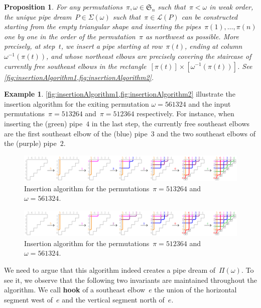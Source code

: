 \documentclass[reqno]{amsart}
\newtheorem{proposition}[theorem]{Proposition}
\theoremstyle{definition}
\newtheorem{example}[theorem]{Example}
\newcommand{\defn}[1]{\textbf{\textsf{\color{PineGreen} #1}}} %
\newcommand{\fS}{\mathfrak{S}} %
\newcommand{\pipeDreams}{\Pi} %
\newcommand{\acyclicPipeDreams}{\Sigma} %
\newcommand{\linearExtensions}{\mathcal{L}} %
\begin{document}
\begin{proposition}
\label{prop:insertionAlgorithm}
For any permutations~$\pi,\omega \in \fS_n$ such that~$\pi < \omega$ in weak order, the unique pipe dream~$P \in \acyclicPipeDreams(\omega)$ such that~$\pi \in \linearExtensions(P)$ can be constructed starting from the empty triangular shape and inserting the pipes~$\pi(1), \dots, \pi(n)$ one by one in the order of the permutation~$\pi$ as northwest as possible.
More precisely, at step~$t$, we insert a pipe starting at row~$\pi(t)$, ending at column~$\omega^{-1}(\pi(t))$, and whose northeast elbows are precisely covering the staircase of currently free southeast elbows in the rectangle~$[\pi(t)] \times [\omega^{-1}(\pi(t))]$.
See \cref{fig:insertionAlgorithm1,fig:insertionAlgorithm2}.
\end{proposition}

\begin{example}
\label{exm:insertionAlgorithm}
\cref{fig:insertionAlgorithm1,fig:insertionAlgorithm2} illustrate the insertion algorithm for the exiting permutation ${\omega = 561324}$ and the input permutations~${\pi = 513264}$ and~${\pi = 512364}$ respectively.
For instance, when inserting the (green) pipe~$4$ in the last step, the currently free southeast elbows are the first southeast elbow of the (blue) pipe~$3$ and the two southeast elbows of the (purple) pipe~$2$.
%
\begin{figure}[t]
	\centerline{\includegraphics[scale=.9]{insertion1}}
	\caption{Insertion algorithm for the permutations~$\pi = 513264$ and~$\omega = 561324$.}
	\label{fig:insertionAlgorithm1}
\end{figure}
%
\begin{figure}[t]
	\centerline{\includegraphics[scale=.9]{insertion2}}
	\caption{Insertion algorithm for the permutations~$\pi = 512364$ and~$\omega = 561324$.}
	\label{fig:insertionAlgorithm2}
\end{figure}
\end{example}

We need to argue that this algorithm indeed creates a pipe dream of~$\pipeDreams(\omega)$.
To see it, we observe that the following two invariants are maintained throughout the algorithm.
We call \defn{hook} of a southeast elbow~$e$ the union of the horizontal segment west of~$e$ and the vertical segment north of~$e$.
\end{document}
